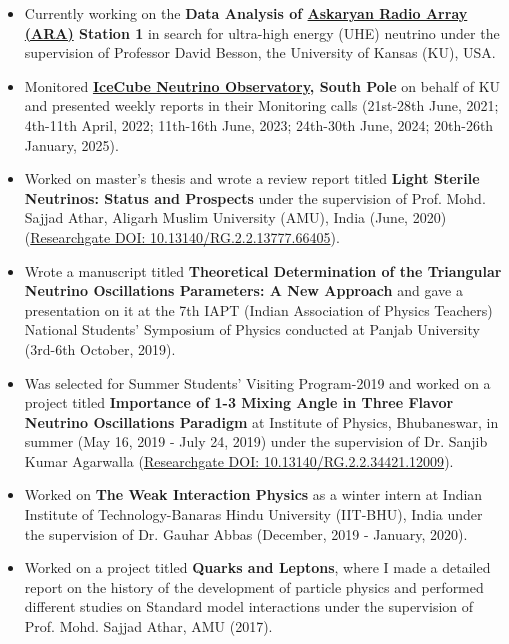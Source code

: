 \documentclass[10pt]{report}
\begin{document}
\begin{itemize}
\item Currently working on the \textbf{Data Analysis of \href{https://ara.wipac.wisc.edu/home}{Askaryan Radio Array (ARA)} Station 1} in search for ultra-high energy (UHE) neutrino under the supervision of Professor David Besson, the University of Kansas (KU), USA.  
\item Monitored \textbf{\href{https://icecube.wisc.edu}{IceCube Neutrino Observatory}, South Pole} on behalf of KU and presented weekly reports in their Monitoring calls (21st-28th June, 2021; 4th-11th April, 2022; 11th-16th June, 2023; 24th-30th June, 2024; 20th-26th January, 2025).
\item Worked on master's thesis and wrote a review report titled \textbf{Light Sterile Neutrinos: Status and Prospects} under the supervision of Prof. Mohd. Sajjad Athar, Aligarh Muslim University (AMU), India (June, 2020) (\href{https://www.researchgate.net/publication/354254795_LIGHT_STERILE_NEUTRINOS_OSCILLATION_STATUS_AND_PROSPECTS}{Researchgate DOI: 10.13140/RG.2.2.13777.66405}).
\item Wrote a manuscript titled \textbf{Theoretical Determination of the Triangular Neutrino Oscillations Parameters: A New Approach} and gave a presentation on it at the 7th IAPT (Indian Association of Physics Teachers) National Students’ Symposium of Physics conducted at Panjab University (3rd-6th October, 2019).
\item Was selected for Summer Students’ Visiting Program-2019 and worked on a project titled \textbf{Importance of 1-3 Mixing Angle in Three Flavor Neutrino Oscillations Paradigm} at Institute of Physics, Bhubaneswar, in summer (May 16, 2019 - July 24, 2019) under the supervision of Dr. Sanjib Kumar Agarwalla (\href{https://www.researchgate.net/publication/340095776_Importance_of_1-3_Mixing_Angle_in_Three-Flavor_Neutrino_Oscillations_Paradigm_SSVP_Summer_Project_Report}{Researchgate DOI: 10.13140/RG.2.2.34421.12009}).
\item Worked on \textbf{The Weak Interaction Physics} as a winter intern at Indian Institute of Technology-Banaras Hindu University (IIT-BHU), India under the supervision of Dr. Gauhar Abbas (December, 2019 - January, 2020). 
\item Worked on a project titled \textbf{Quarks and Leptons}, where I made a detailed report on the history of the development of particle physics and performed different studies on Standard model interactions under the supervision of Prof. Mohd. Sajjad Athar, AMU (2017).
\end{itemize}
\end{document}
